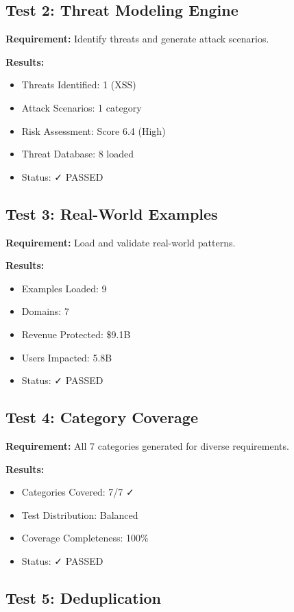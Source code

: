 \documentclass[12pt,oneside]{report}
\begin{document}
\subsection{Test 2: Threat Modeling Engine}

\textbf{Requirement:} Identify threats and generate attack scenarios.

\textbf{Results:}
\begin{itemize}
    \item Threats Identified: 1 (XSS)
    \item Attack Scenarios: 1 category
    \item Risk Assessment: Score 6.4 (High)
    \item Threat Database: 8 loaded
    \item Status: ✓ PASSED
\end{itemize}

\subsection{Test 3: Real-World Examples}

\textbf{Requirement:} Load and validate real-world patterns.

\textbf{Results:}
\begin{itemize}
    \item Examples Loaded: 9
    \item Domains: 7
    \item Revenue Protected: \$9.1B
    \item Users Impacted: 5.8B
    \item Status: ✓ PASSED
\end{itemize}

\subsection{Test 4: Category Coverage}

\textbf{Requirement:} All 7 categories generated for diverse requirements.

\textbf{Results:}
\begin{itemize}
    \item Categories Covered: 7/7 ✓
    \item Test Distribution: Balanced
    \item Coverage Completeness: 100\%
    \item Status: ✓ PASSED
\end{itemize}

\subsection{Test 5: Deduplication}
\end{document}
